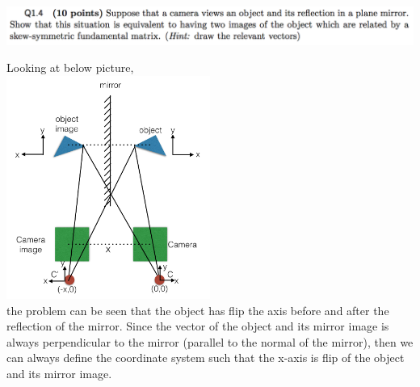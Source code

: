 \documentclass[12pt,letterpaper,boxed]{hmcpset}
\begin{document}
\begin{problem}[]
\includegraphics[width=\textwidth]{1_4.png}
\end{problem}
\begin{solution}
Looking at below picture, \\
\includegraphics[width=0.5\textwidth]{1-4.png}\\
the problem can be seen that the object has flip the axis
before and after the reflection of the mirror. Since the vector of the object and its mirror image
is always perpendicular to the mirror (parallel to the normal of the mirror), then 
we can always define the coordinate system such that the x-axis is flip of the object and its 
mirror image. 


\end{solution}
\end{document}
